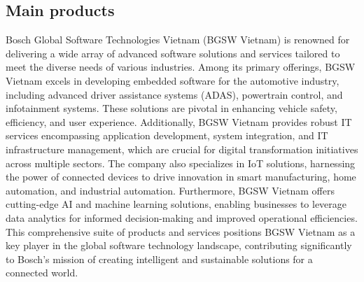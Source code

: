 \subsection{Main products}
Bosch Global Software Technologies Vietnam (BGSW Vietnam) is renowned for delivering a wide array of advanced software solutions and services tailored to meet the diverse needs of various industries. Among its primary offerings, BGSW Vietnam excels in developing embedded software for the automotive industry, including advanced driver assistance systems (ADAS), powertrain control, and infotainment systems. These solutions are pivotal in enhancing vehicle safety, efficiency, and user experience. Additionally, BGSW Vietnam provides robust IT services encompassing application development, system integration, and IT infrastructure management, which are crucial for digital transformation initiatives across multiple sectors. The company also specializes in IoT solutions, harnessing the power of connected devices to drive innovation in smart manufacturing, home automation, and industrial automation. Furthermore, BGSW Vietnam offers cutting-edge AI and machine learning solutions, enabling businesses to leverage data analytics for informed decision-making and improved operational efficiencies. This comprehensive suite of products and services positions BGSW Vietnam as a key player in the global software technology landscape, contributing significantly to Bosch’s mission of creating intelligent and sustainable solutions for a connected world.